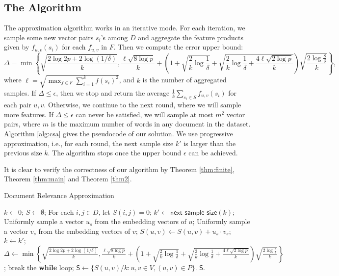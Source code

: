 \documentclass{article}
\begin{document}
\subsection{The Algorithm}
The approximation algorithm works in an iterative mode. For each iteration, we sample some new vector pairs $s_i$'s among $D$ and aggregate the feature products given by $f_{u,v}(s_i)$ for each $f_{u,v}$ in $F$. Then we compute the error upper bound:
$$\Delta = \min\left\{\sqrt{\frac{2\log 2p + 2\log(1/\delta)}{k}}, \frac{\ell\sqrt{8\log p}}{k} +\left(1+\sqrt{\frac{2}{k}\log \frac{1}{\delta}} + \sqrt{\frac{2}{k}\log \frac{1}{\delta} + \frac{4\ell\sqrt{2\log p}}{k}}\right)\sqrt{\frac{2\log \frac{8}{\delta}}{k}}\right\},$$
where $\ell = \sqrt{\max_{f\in F} \sum_{i=1}^k f(s_i)^2}$, and $k$ is the number of aggregated samples. 
If $\Delta \leq \epsilon$, then we stop and return the average $\frac{1}{k}\sum_{s_i\in S}f_{u,v}(s_i)$ for each pair $u, v$. Otherwise, we continue to the next round, where we will sample more features. If $\Delta \leq \epsilon$ can never be satisfied, we will sample at most $m^2$ vector pairs, where $m$ is the maximum number of words in any document in the dataset. Algorithm \ref{alg:csa} gives the pseudocode of our solution. We use progressive approximation, i.e., for each round, the next sample size $k'$ is larger than the previous size $k$. The algorithm stops once the upper bound $\epsilon$ can be achieved. 

It is clear to verify the correctness of our algorithm by Theorem \ref{thm:finite}, Theorem \ref{thm:main} and Theorem \ref{thm2}.

\begin{algorithm}[!t]
\caption{\textsf{Document Relevance Approximation}}
\label{alg:csa}
\renewcommand{\algorithmicrequire}{\textbf{Input:}}
\renewcommand{\algorithmicensure}{\textbf{Output:}}
\begin{algorithmic}
\State $k \gets 0$; $S \gets \emptyset$;
\State For each $i,j \in D$, let $S(i,j) = 0$;
	\State $k' \gets \textsf{next-sample-size}(k)$;
		  \State Uniformly sample a vector $u_s$ from the embedding vectors of $u$;
			\State Uniformly sample a vector $v_s$ from the embedding vectors of $v$;
			\State $S(u,v) \gets S(u,v)+u_s\cdot v_s$;
		\EndFor
	\EndFor
	\State $k \gets k'$;
	\State $\Delta \gets \min\left\{\sqrt{\frac{2\log 2p + 2\log(1/\delta)}{k}}, \frac{\ell\sqrt{8\log p}}{k} +\left(1+\sqrt{\frac{2}{k}\log \frac{1}{\delta}} + \sqrt{\frac{2}{k}\log \frac{1}{\delta} + \frac{4\ell\sqrt{2\log p}}{k}}\right)\sqrt{\frac{2\log \frac{8}{\delta}}{k}}\right\}$;
	\If {$\Delta \leq \epsilon$}
		\State break the {\bf while} loop;
	\EndIf
\EndWhile
\State $\mathsf{S} \gets \{S(u,v)/k : u,v\in V, (u,v)\in P\}$.
 $\mathsf{S}$.
\end{algorithmic}
\end{algorithm}
\end{document}

